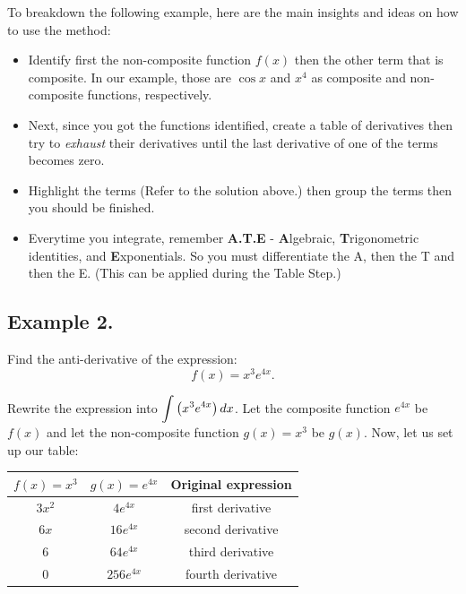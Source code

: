 \documentclass[11pt,paper=letter]{scrartcl}
\begin{document}
\begin{mdframed}[style=jremmdbox, frametitle=Remarks.]
{\footnotesize To breakdown the following example, here are the main insights and ideas on how to use the method:

\vspace{-2mm}

\begin{itemize}
    \item Identify first the non-composite function $f(x)$ then the other term that is composite. In our example, those are $\cos x$ and $x^4$ as composite and non-composite functions, respectively.
    
    \item Next, since you got the functions identified, create a table of derivatives then try to \textit{exhaust} their derivatives until the last derivative of one of the terms becomes zero.
    
    \item Highlight the terms (Refer to the solution above.) then group the terms then you should be finished.
    
    \item Everytime you integrate, remember \textbf{A.T.E} - \textbf{A}lgebraic, \textbf{T}rigonometric identities, and \textbf{E}xponentials. So you must differentiate the A, then the T and then the E. (This can be applied during the Table Step.)
     
\end{itemize}
}
\end{mdframed}

\newpage

\subsection*{Example 2.}

\begin{mdframed}[style=jradduemmdbox, frametitle=Example 2.,]
Find the anti-derivative of the expression: $$f(x) = x^3 e^{4x}.$$
\end{mdframed}

\sol Rewrite the expression into $\mathlarger{\int \left(x^3 e^{4x}\right)dx}$. Let the composite function $e^{4x}$ be $f(x)$ and let the non-composite function $g(x) = x^3$ be $g(x)$. Now, let us set up our table:

\begin{center}
    \begin{tabular}{c|c|c}
        $f(x) = x^{3}$ & $g(x) = e^{4x}$ & \textbf{Original expression}\\
            \hline
        $3x^2$ & $4e^{4x}$ & first derivative \\
            \hline
        $6x$ & $16e^{4x}$ & second derivative \\    
            \hline
        $6$ & $64e^{4x}$ & third derivative \\   
            \hline
        $0$ & $256e^{4x}$ & fourth derivative \\   
     
    \end{tabular}
\end{center}
\end{document}
